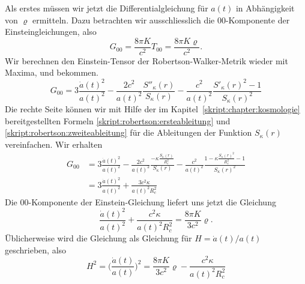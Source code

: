 Als erstes müssen wir jetzt die Differentialgleichung für $a(t)$
in Abhängigkeit von $\varrho$ ermitteln.
Dazu betrachten wir ausschliesslich die $00$-Komponente der
Einsteingleichungen, also
\begin{equation}
G_{00} = \frac{8\pi K}{c^2} T_{00}=\frac{8\pi K\varrho}{c^2}.
\label{skript:friedmann:einstein}
\end{equation}
Wir berechnen den Einstein-Tensor der Robertson-Walker-Metrik
wieder mit Maxima, und bekommen.
\begin{equation}
G_{00}
=
3\frac{\dot a(t)^2}{a(t)^2}
-\frac{2c^2}{a(t)^2}\frac{S''_\kappa(r)}{S_\kappa(r)}
-\frac{c^2}{a(t)^2}
\frac{S'_\kappa(r)^2-1}{S_\kappa(r)^2}
\end{equation}
Die rechte Seite können wir mit Hilfe der im
Kapitel~\ref{skript:chapter:kosmologie} bereitgestellten Formeln
\eqref{skript:robertson:ersteableitung} und
\eqref{skript:robertson:zweiteableitung} für die Ableitungen der Funktion
$S_\kappa(r)$ vereinfachen.
Wir erhalten 
\begin{align*}
G_{00}
&=
3\frac{\dot a(t)^2}{a(t)^2}
-\frac{2c^2}{a(t)^2}\frac{-\kappa\displaystyle \frac{S_\kappa(r)}{R_c^2}}{S_\kappa(r)}
-\frac{c^2}{a(t)^2}
\frac{1-\kappa \frac{\displaystyle S_\kappa(r)^2}{R_c^2}-1}{S_\kappa(r)^2}
\\
&=
3\frac{\dot a(t)^2}{a(t)^2}
+\frac{3c^2\kappa}{a(t)^2R_c^2}
\end{align*}
Die $00$-Komponente der Einstein-Gleichung liefert uns jetzt die Gleichung
\begin{equation}
\frac{\dot a(t)^2}{a(t)^2}
+
\frac{c^2\kappa}{a(t)^2R_c^2}
=
\frac{8\pi K}{3c^2}\varrho.
\end{equation}
Üblicherweise wird die Gleichung als Gleichung für $H=\dot a(t)/a(t)$
geschrieben, also
\begin{equation}
H^2
=
\biggl(
\frac{\dot a(t)}{a(t)}
\biggr)^2
=
\frac{8\pi K}{3c^2}\varrho
-
\frac{c^2\kappa }{a(t)^2R_c^2}
\label{skript:friedmann:friedmann}
\end{equation}

